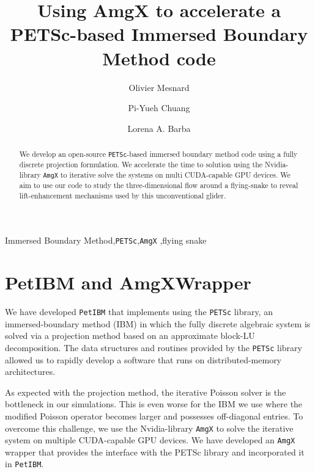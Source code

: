 \documentclass[review]{elsarticle}
\begin{document}
\begin{frontmatter}

\title{Using AmgX to accelerate a PETSc-based Immersed Boundary Method code}

\address[gwu]{Mechanical and Aerospace Engineering, The George Washington University, \\
Washington, DC, 20052, United-States}
\author[gwu]{Olivier Mesnard}
\author[gwu]{Pi-Yueh Chuang}
\author[gwu]{Lorena A. Barba}


\begin{abstract}
We develop an open-source \texttt{PETSc}-based immersed boundary method code using a fully discrete projection formulation. We accelerate the time to solution using the Nvidia-library \texttt{AmgX} to iterative solve the systems on multi CUDA-capable GPU devices. We aim to use our code to study the three-dimensional flow around a  flying-snake to reveal lift-enhancement mechanisms used by this unconventional glider.
\end{abstract}

\begin{keyword}
Immersed Boundary Method\sep \texttt{PETSc}\sep \texttt{AmgX} \sep flying snake
\end{keyword}

\end{frontmatter}

\linenumbers

\section{PetIBM and AmgXWrapper}

We have developed \texttt{PetIBM} that implements using the \texttt{PETSc} \cite{PETSc_webpage_2016} library, an immersed-boundary method (IBM) \cite{Taira_Colonius_2007} in which the fully discrete algebraic system is solved via a projection method based on an approximate block-LU decomposition.
The data structures and routines provided by the \texttt{PETSc} library allowed us to rapidly develop a software that runs on distributed-memory architectures.

As expected with the projection method, the iterative Poisson solver is the bottleneck in our simulations.
This is even worse for the IBM we use where the modified Poisson operator becomes larger and possesses off-diagonal entries.
To overcome this challenge, we use the Nvidia-library \texttt{AmgX} \cite{Nvidia_AmgX} to solve the iterative system on multiple CUDA-capable GPU devices.
We have developed an \texttt{AmgX} wrapper \cite{AmgXWrapper} that provides the interface with the PETSc library and incorporated it in \texttt{PetIBM}.
\end{document}
